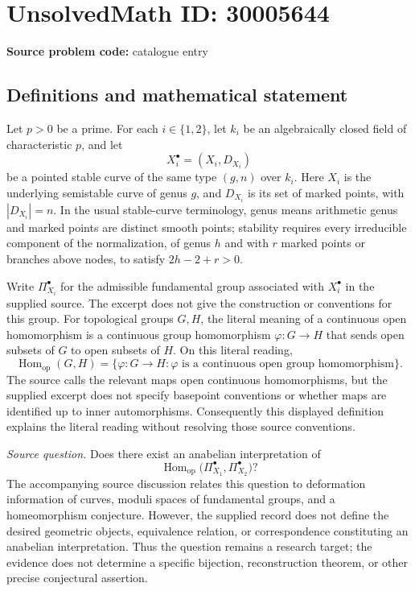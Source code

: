 \documentclass[11pt]{article}
\begin{document}
\section*{UnsolvedMath ID: 30005644}
\textbf{Source problem code:} catalogue entry
\subsection{Definitions and mathematical statement}
Let \(p>0\) be a prime. For each \(i\in\{1,2\}\), let \(k_i\) be an algebraically closed field of characteristic \(p\), and let
\[
X_i^{\bullet}=(X_i,D_{X_i})
\]
be a pointed stable curve of the same type \((g,n)\) over \(k_i\). Here \(X_i\) is the underlying semistable curve of genus \(g\), and \(D_{X_i}\) is its set of marked points, with \(|D_{X_i}|=n\). In the usual stable-curve terminology, genus means arithmetic genus and marked points are distinct smooth points; stability requires every irreducible component of the normalization, of genus \(h\) and with \(r\) marked points or branches above nodes, to satisfy \(2h-2+r>0\).

Write \(\Pi_{X_i}^{\bullet}\) for the admissible fundamental group associated with \(X_i^{\bullet}\) in the supplied source. The excerpt does not give the construction or conventions for this group. For topological groups \(G,H\), the literal meaning of a continuous open homomorphism is a continuous group homomorphism \(\varphi:G\to H\) that sends open subsets of \(G\) to open subsets of \(H\). On this literal reading,
\[
\operatorname{Hom}_{\mathrm{op}}(G,H)
=\{\varphi:G\to H:\varphi\text{ is a continuous open group homomorphism}\}.
\]
The source calls the relevant maps open continuous homomorphisms, but the supplied excerpt does not specify basepoint conventions or whether maps are identified up to inner automorphisms. Consequently this displayed definition explains the literal reading without resolving those source conventions.

\emph{Source question.} Does there exist an anabelian interpretation of
\[
\operatorname{Hom}_{\mathrm{op}}
\bigl(\Pi_{X_1}^{\bullet},\Pi_{X_2}^{\bullet}\bigr)?
\]
The accompanying source discussion relates this question to deformation information of curves, moduli spaces of fundamental groups, and a homeomorphism conjecture. However, the supplied record does not define the desired geometric objects, equivalence relation, or correspondence constituting an anabelian interpretation. Thus the question remains a research target; the evidence does not determine a specific bijection, reconstruction theorem, or other precise conjectural assertion.
\end{document}

